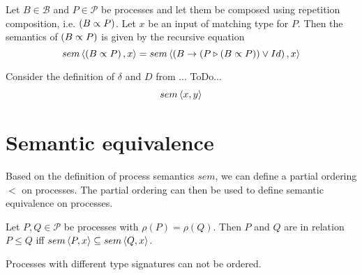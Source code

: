 \begin{definition}
\label{def:sem_repetition}
Let $B \in \mathcal{B}$ and $P \in \mathcal{P}$ be processes and let them be composed using repetition composition, i.e. $\left( B \propto P \right)$. Let $x$ be an input of matching type for $P$. Then the semantics of $\left( B \propto P \right)$ is given by the recursive equation
  \begin{equation}
    \label{eqn_sem_repetition}
    sem \left\langle \left( B \propto P \right), x \right\rangle = sem \left\langle \left( B \to \left( P \triangleright \left( B \propto P \right) \right) \vee Id \right), x \right\rangle
  \end{equation}

\hfill\qedsymbol
\end{definition}

\begin{example}
\label{exp:sem_repetition}
Consider the definition of $\delta$ and $D$ from  ... ToDo...
  \begin{eqnarray*}
    sem \left\langle x, y \right\rangle
  \end{eqnarray*}
  \hfill\qedsymbol
\end{example}


\section{Semantic equivalence}
Based on the definition of process semantics $sem$, we can define a partial ordering $<$ on processes. The partial ordering can then be used to define semantic equivalence on processes.



\begin{definition}
\label{def:process_ordering}
Let $P, Q \in \mathcal{P}$ be processes with $\rho \left( P \right) = \rho \left( Q \right)$. Then $P$ and $Q$ are in relation $P \leq Q$ iff $sem \left\langle P, x \right\rangle \subseteq sem \left\langle Q, x \right\rangle$.

Processes with different type signatures can not be ordered.

\hfill\qedsymbol
\end{definition}

